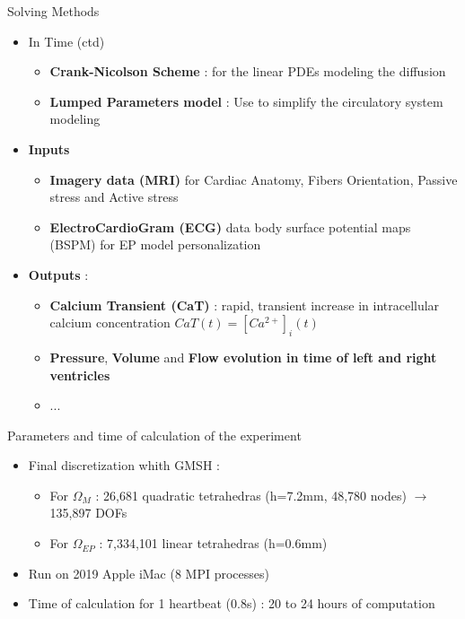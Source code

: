 \documentclass{beamer}
\begin{document}
\begin{frame}{Solving Methods \cite{gerach2021electro}}
  \begin{itemize}
    \item In Time (ctd)
      \begin{itemize}
        \item \textbf{Crank-Nicolson Scheme} : for the linear PDEs modeling the diffusion
        \item \textbf{Lumped Parameters model} : Use to simplify the circulatory system modeling
      \end{itemize}
    \item \textbf{Inputs} 
      \begin{itemize}
        \item \textbf{Imagery data (MRI)} for Cardiac Anatomy, Fibers Orientation, Passive stress and Active stress
        \item \textbf{ElectroCardioGram (ECG)} data body surface potential maps (BSPM) for EP model personalization
      \end{itemize}
    \item \textbf{Outputs} :
    \begin{itemize}
      \item \textbf{Calcium Transient (CaT)} : rapid, transient increase in intracellular calcium concentration $CaT(t)=[Ca^{2+}]_i(t)$
      \item \textbf{Pressure}, \textbf{Volume} and \textbf{Flow evolution in time of left and right ventricles}
      \item ...
    \end{itemize}
  \end{itemize}
\end{frame}

\begin{frame}{Parameters and time of calculation of the experiment}
  \begin{itemize}
  \item Final discretization whith GMSH :
    \begin{itemize}
      \item For $\Omega_{M}$ : 26,681 quadratic tetrahedras (h=7.2mm, 48,780 nodes) $\rightarrow$ 135,897 DOFs
      \item For $\Omega_{EP}$ : 7,334,101 linear tetrahedras (h=0.6mm)
    \end{itemize}
  \item Run on 2019 Apple iMac (8 MPI processes)
  \item Time of calculation for 1 heartbeat (0.8s) : 20 to 24 hours of computation
  \end{itemize}
\end{frame}
\end{document}
